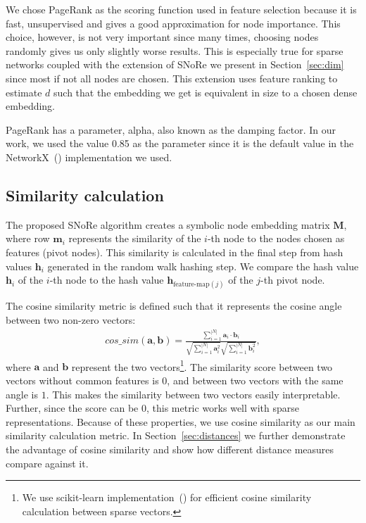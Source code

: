 \documentclass[twoside,11pt]{article}
\begin{document}
We chose PageRank as the scoring function used in feature selection because it is fast, unsupervised and gives a good approximation for node importance. This choice, however, is not very important since many times, choosing nodes randomly gives us only slightly worse results. This is especially true for sparse networks coupled with the extension of SNoRe we present in Section~\ref{sec:dim} since most if not all nodes are chosen. This extension uses feature ranking to estimate $d$ such that the embedding we get is equivalent in size to a chosen dense embedding.

PageRank has a parameter, alpha, also known as the damping factor. In our work, we used the value 0.85 as the parameter since it is the default value in the NetworkX~(\cite{SciPyProceedings_11}) implementation we used.

\subsection{Similarity calculation}
\label{sec:similaritycalc}
The proposed SNoRe algorithm creates a symbolic node embedding matrix $\boldsymbol{M}$, where row $\boldsymbol{m}_i$ represents the similarity of the $i$-th node to the nodes chosen as features (pivot nodes). This similarity is calculated in the final step from hash values $\boldsymbol{h}_i$ generated in the random walk hashing step. We compare the hash value $\boldsymbol{h}_i$ of the $i$-th node to the hash value $\boldsymbol{h}_{\textrm{feature-map}(j)}$ of the $j$-th pivot node.

The cosine similarity metric is defined such that it represents the cosine angle between two non-zero vectors: \begin{align*}
cos\_sim(\boldsymbol{a}, \boldsymbol{b}) = \frac{\sum_{i=1}^{|N|}\boldsymbol{a}_i\cdot \boldsymbol{b}_i} {\sqrt{ \sum_{i=1}^{|N|} \boldsymbol{a}_{i}^2} \sqrt{\sum_{i=1}^{|N|} \boldsymbol{b}_{i}^2}},
\end{align*}
where $\boldsymbol{a}$ and $\boldsymbol{b}$ represent the two vectors\footnote{We use scikit-learn implementation~(\cite{scikit-learn}) for efficient cosine similarity calculation between sparse vectors.}. The similarity score between two vectors without common features is $0$, and between two vectors with the same angle is $1$. This makes the similarity between two vectors easily interpretable. Further, since the score can be $0$, this metric works well with sparse representations. Because of these properties, we use cosine similarity as our main similarity calculation metric.
In Section~\ref{sec:distances} we further demonstrate the advantage of cosine similarity and show how different distance measures compare against it.
\end{document}
